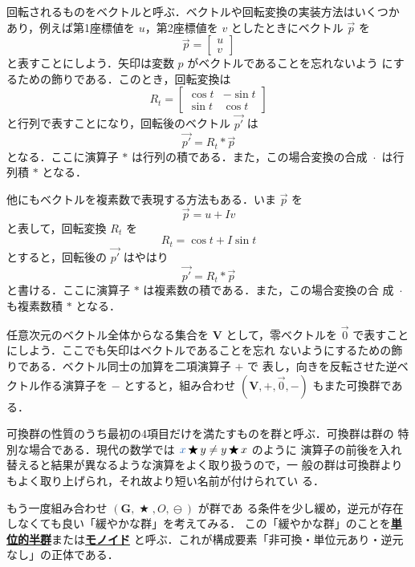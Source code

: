 \documentclass[a5paper,twoside,fleqn,draft]{jsbook}
\def\varColor{NavyBlue}
\newcommand{\keyword}[1]{{\underline{\textbf{#1}}}}
\newcommand{\mVar}[1]{\textcolor{\varColor}{#1}}
\newcommand{\mXVar}{\mVar{x}}
\DeclareMathOperator{\mBinOp}{\bigstar}
\DeclareMathOperator{\mCompRot}{\cdot} %
\DeclareMathOperator{\mMinus}{\ominus}
\newcommand{\mSet}[1]{\mathbf{#1}}
\newcommand{\mTupleWith}[1]{\left(#1\right)}
\newcommand{\mVec}[1]{\Vec{#1}}
\begin{document}
回転されるものをベクトルと呼ぶ．ベクトルや回転変換の実装方法はいくつか
あり，例えば第1座標値を $u$，第2座標値を $v$ としたときにベクトル
$\mVec{p}$ を
\begin{equation}
\mVec{p}=\begin{bmatrix}u\\v\end{bmatrix}
\end{equation}
と表すことにしよう．矢印は変数 $p$ がベクトルであることを忘れないよう
にするための飾りである．このとき，回転変換は
\begin{equation}
R_t=\begin{bmatrix}\cos t&-\sin t\\\sin t&\cos t\end{bmatrix}
\end{equation}
と行列で表すことになり，回転後のベクトル $\mVec{p'}$ は
\begin{equation}
\mVec{p'}=R_t*\mVec{p}
\end{equation}
となる．ここに演算子 $*$ は行列の積である．また，この場合変換の合成
$\mCompRot$ は行列積 $*$ となる．

他にもベクトルを複素数で表現する方法もある．いま $\mVec{p}$ を
\begin{equation}
\mVec{p}=u+I v
\end{equation}
と表して，回転変換 $R_t$ を
\begin{equation}
R_t=\cos t+I\sin t
\end{equation}
とすると，回転後の $\mVec{p'}$ はやはり
\begin{equation}
\mVec{p'}=R_t*\mVec{p}
\end{equation}
と書ける．ここに演算子 $*$ は複素数の積である．また，この場合変換の合
成 $\mCompRot$ も複素数積 $*$ となる．

任意次元のベクトル全体からなる集合を $\mSet{V}$ として，零ベクトルを
$\mVec{0}$ で表すことにしよう．ここでも矢印はベクトルであることを忘れ
ないようにするための飾りである．ベクトル同士の加算を二項演算子 $+$ で
表し，向きを反転させた逆ベクトル作る演算子を $-$ とすると，組み合わせ
$\mTupleWith{\mSet{V},+,\mVec{0},-}$ もまた可換群である．

可換群の性質のうち最初の4項目だけを満たすものを群と呼ぶ．可換群は群の
特別な場合である．現代の数学では $\mXVar\mBinOp y\neq y\mBinOp x$ のように
演算子の前後を入れ替えると結果が異なるような演算をよく取り扱うので，一
般の群は可換群よりもよく取り上げられ，それ故より短い名前が付けられてい
る．

もう一度組み合わせ $\mTupleWith{\mSet{G},\mBinOp,O,\mMinus}$ が群であ
る条件を少し緩め，逆元が存在しなくても良い「緩やかな群」を考えてみる．
この「緩やかな群」のことを\keyword{単位的半群}または\keyword{モノイド}
と呼ぶ．これが構成要素「非可換・単位元あり・逆元なし」の正体である．
\end{document}
